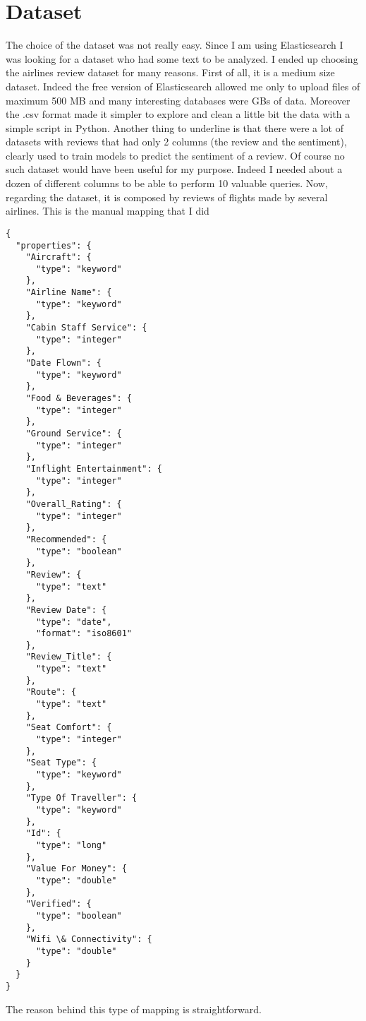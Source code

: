 \documentclass{Configuration_Files/PoliMi3i_thesis}
\begin{document}
\chapter{Dataset}
The choice of the dataset was not really easy. Since I am using Elasticsearch I was looking for a dataset who had some text to be analyzed. I ended up choosing the airlines review dataset for many reasons. First of all, it is a medium size dataset. Indeed the free version of  Elasticsearch allowed me only to upload files of maximum 500 MB and many interesting databases were GBs of data. Moreover the .csv format made it simpler to explore and clean a little bit the data with a simple script in Python. Another thing to underline is that there were a lot of datasets with reviews that had only 2 columns (the review and the sentiment), clearly used to train models to predict the sentiment of a review. Of course no such dataset would have been useful for my purpose. Indeed I needed about a dozen of different columns to be able to perform 10 valuable queries. 
Now, regarding the dataset, it is composed by reviews of flights made by several airlines. This is the manual mapping that I did
\begin{verbatim}
{
  "properties": {
    "Aircraft": {
      "type": "keyword"
    },
    "Airline Name": {
      "type": "keyword"
    },
    "Cabin Staff Service": {
      "type": "integer"
    },
    "Date Flown": {
      "type": "keyword"
    },
    "Food & Beverages": {
      "type": "integer"
    },
    "Ground Service": {
      "type": "integer"
    },
    "Inflight Entertainment": {
      "type": "integer"
    },
    "Overall_Rating": {
      "type": "integer"
    },
    "Recommended": {
      "type": "boolean"
    },
    "Review": {
      "type": "text"
    },
    "Review Date": {
      "type": "date",
      "format": "iso8601"
    },
    "Review_Title": {
      "type": "text"
    },
    "Route": {
      "type": "text"
    },
    "Seat Comfort": {
      "type": "integer"
    },
    "Seat Type": {
      "type": "keyword"
    },
    "Type Of Traveller": {
      "type": "keyword"
    },
    "Id": {
      "type": "long"
    },
    "Value For Money": {
      "type": "double"
    },
    "Verified": {
      "type": "boolean"
    },
    "Wifi \& Connectivity": {
      "type": "double"
    }
  }
}
\end{verbatim}
The reason behind this type of mapping is straightforward. 
\end{document}

